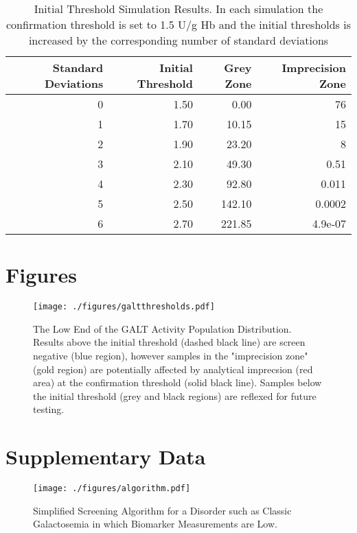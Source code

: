\documentclass[review]{elsarticle}
\begin{document}
\begin{table}[ht]
\centering
\begin{tabular}{rrrr}
  \hline
Standard Deviations & Initial Threshold & Grey Zone & Imprecision Zone \\ 
  \hline
  0 & 1.50 & 0.00 &  76 \\ 
    1 & 1.70 & 10.15 &  15 \\ 
    2 & 1.90 & 23.20 &   8 \\ 
    3 & 2.10 & 49.30 & 0.51 \\ 
    4 & 2.30 & 92.80 & 0.011 \\ 
    5 & 2.50 & 142.10 & 0.0002 \\ 
    6 & 2.70 & 221.85 & 4.9e-07 \\ 
   \hline
\end{tabular}
\caption{Initial Threshold Simulation Results. In each simulation the confirmation threshold is set to 1.5 U/g Hb and the initial thresholds is increased by the corresponding number of standard deviations} 
\label{tab:imprecision}
\end{table}

\clearpage

\section*{Figures}
\label{sec:org1997044}

\begin{figure}[htbp]
\centering
\texttt{[image: ./figures/galtthresholds.pdf]}
\caption{\label{fig:orge881536}The Low End of the GALT Activity Population Distribution. Results above the initial threshold (dashed black line) are screen negative (blue region), however samples in the "imprecision zone" (gold region) are potentially affected by analytical imprecsion (red area) at the confirmation threshold (solid black line). Samples below the initial threshold (grey and black regions) are reflexed for future testing.}
\end{figure}

\clearpage

\section*{Supplementary Data}
\label{sec:org7a1c82f}

\beginsupplement

\begin{figure}[htbp]
\centering
\texttt{[image: ./figures/algorithm.pdf]}
\caption{\label{fig:org77f8f02}Simplified Screening Algorithm for a Disorder such as Classic Galactosemia in which Biomarker Measurements are Low.}
\end{figure}
\end{document}
